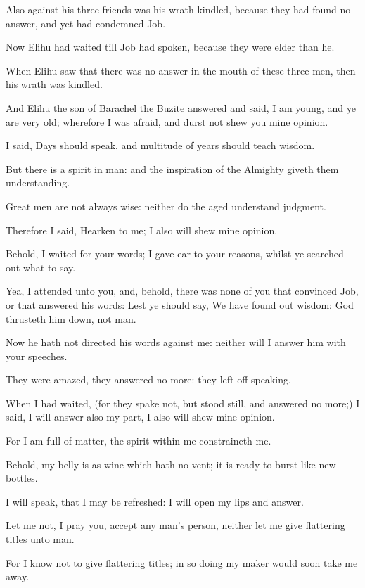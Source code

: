 \verse Also against his three friends was his wrath kindled, because they had found no answer, and yet had condemned Job.

\verse Now Elihu had waited till Job had spoken, because they were elder than he.

\verse When Elihu saw that there was no answer in the mouth of these three men, then his wrath was kindled.

\verse And Elihu the son of Barachel the Buzite answered and said, I am young, and ye are very old; wherefore I was afraid, and durst not shew you mine opinion.

\verse I said, Days should speak, and multitude of years should teach wisdom.

\verse But there is a spirit in man: and the inspiration of the Almighty giveth them understanding.

\verse Great men are not always wise: neither do the aged understand judgment.

\verse Therefore I said, Hearken to me; I also will shew mine opinion.

\verse Behold, I waited for your words; I gave ear to your reasons, whilst ye searched out what to say.

\verse Yea, I attended unto you, and, behold, there was none of you that convinced Job, or that answered his words: \verse Lest ye should say, We have found out wisdom: God thrusteth him down, not man.

\verse Now he hath not directed his words against me: neither will I answer him with your speeches.

\verse They were amazed, they answered no more: they left off speaking.

\verse When I had waited, (for they spake not, but stood still, and answered no more;) \verse I said, I will answer also my part, I also will shew mine opinion.

\verse For I am full of matter, the spirit within me constraineth me.

\verse Behold, my belly is as wine which hath no vent; it is ready to burst like new bottles.

\verse I will speak, that I may be refreshed: I will open my lips and answer.

\verse Let me not, I pray you, accept any man's person, neither let me give flattering titles unto man.

\verse For I know not to give flattering titles; in so doing my maker would soon take me away.


